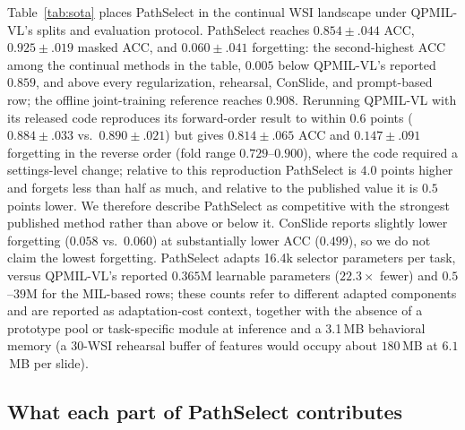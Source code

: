 \documentclass{article}
\begin{document}
Table~\ref{tab:sota} places PathSelect in the continual WSI landscape under QPMIL-VL's splits and evaluation protocol. PathSelect reaches $0.854{\pm}.044$ ACC, $0.925{\pm}.019$ masked ACC, and $0.060{\pm}.041$ forgetting: the second-highest ACC among the continual methods in the table, $0.005$ below QPMIL-VL's reported $0.859$, and above every regularization, rehearsal, ConSlide, and prompt-based row; the offline joint-training reference reaches $0.908$. Rerunning QPMIL-VL with its released code reproduces its forward-order result to within $0.6$ points ($0.884{\pm}.033$ vs.\ $0.890{\pm}.021$) but gives $0.814{\pm}.065$ ACC and $0.147{\pm}.091$ forgetting in the reverse order (fold range $0.729$--$0.900$), where the code required a settings-level change; relative to this reproduction PathSelect is $4.0$ points higher and forgets less than half as much, and relative to the published value it is $0.5$ points lower. We therefore describe PathSelect as competitive with the strongest published method rather than above or below it. ConSlide reports slightly lower forgetting ($0.058$ vs.\ $0.060$) at substantially lower ACC ($0.499$), so we do not claim the lowest forgetting. PathSelect adapts 16.4k selector parameters per task, versus QPMIL-VL's reported $0.365$M learnable parameters ($22.3\times$ fewer) and $0.5$--$39$M for the MIL-based rows; these counts refer to different adapted components and are reported as adaptation-cost context, together with the absence of a prototype pool or task-specific module at inference and a 3.1\,MB behavioral memory (a 30-WSI rehearsal buffer of features would occupy about $180$\,MB at $6.1$\,MB per slide).

\subsection{What each part of PathSelect contributes}
\label{ssec:ablation}
\end{document}
